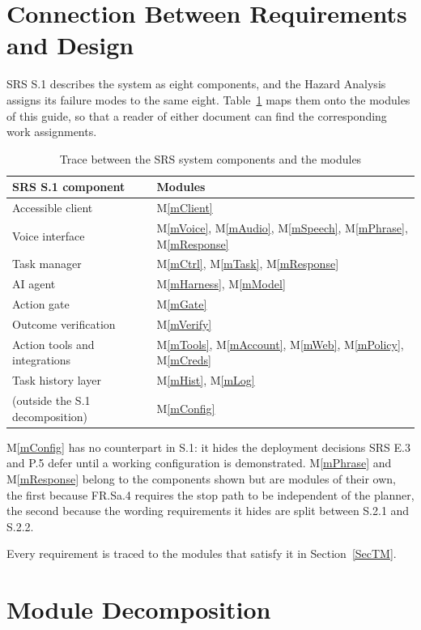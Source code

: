 \documentclass[12pt, titlepage]{article}
\newcommand{\mref}[1]{M\ref{#1}}
\begin{document}
\section{Connection Between Requirements and Design} \label{SecConnection}

SRS S.1 describes the system as eight components, and the Hazard Analysis assigns
its failure modes to the same eight. Table~\ref{TblComp} maps them onto the
modules of this guide, so that a reader of either document can find the
corresponding work assignments.

\begin{table}[H]
\centering
\begin{tabular}{p{} p{}}
\toprule
\textbf{SRS S.1 component} & \textbf{Modules}\\
\midrule
Accessible client & \mref{mClient}\\
Voice interface & \mref{mVoice}, \mref{mAudio}, \mref{mSpeech}, \mref{mPhrase},
\mref{mResponse}\\
Task manager & \mref{mCtrl}, \mref{mTask}, \mref{mResponse}\\
AI agent & \mref{mHarness}, \mref{mModel}\\
Action gate & \mref{mGate}\\
Outcome verification & \mref{mVerify}\\
Action tools and integrations & \mref{mTools}, \mref{mAccount}, \mref{mWeb},
\mref{mPolicy}, \mref{mCreds}\\
Task history layer & \mref{mHist}, \mref{mLog}\\
\midrule
(outside the S.1 decomposition) & \mref{mConfig}\\
\bottomrule
\end{tabular}
\caption{Trace between the SRS system components and the modules}
\label{TblComp}
\end{table}

\mref{mConfig} has no counterpart in S.1: it hides the deployment decisions SRS
E.3 and P.5 defer until a working configuration is demonstrated. \mref{mPhrase}
and \mref{mResponse} belong to the components shown but are modules of their own,
the first because FR.Sa.4 requires the stop path to be independent of the
planner, the second because the wording requirements it hides are split between
S.2.1 and S.2.2.

Every requirement is traced to the modules that satisfy it in
Section~\ref{SecTM}.

\section{Module Decomposition} \label{SecMD}
\end{document}
